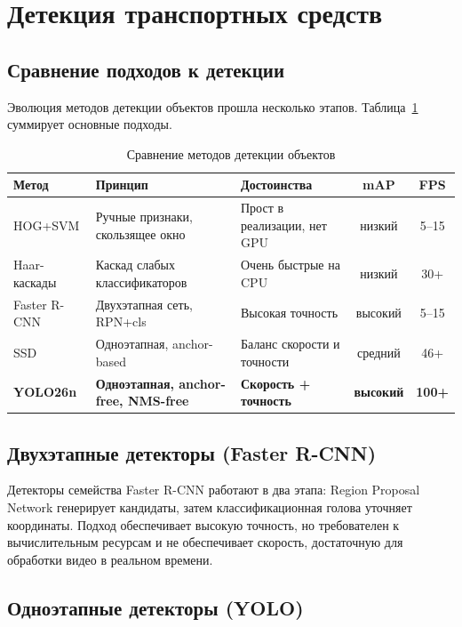 \documentclass[10pt,a4paper]{report}
\numberwithin{equation}{chapter}
\numberwithin{figure}{chapter}
\numberwithin{table}{chapter}
\begin{document}
\section{Детекция транспортных средств}

\subsection{Сравнение подходов к детекции}

Эволюция методов детекции объектов прошла несколько этапов.
Таблица~\ref{tab:detectors} суммирует основные подходы.

\begin{table}[H]
\centering
\caption{Сравнение методов детекции объектов}
\label{tab:detectors}
\begin{tabularx}{\textwidth}{l>{\raggedright\arraybackslash}X>{\raggedright\arraybackslash}Xcc}
\toprule
\textbf{Метод} & \textbf{Принцип} & \textbf{Достоинства} & \textbf{mAP} & \textbf{FPS} \\
\midrule
HOG+SVM       & Ручные признаки, скользящее окно   & Прост в реализации, нет GPU  & низкий & 5--15 \\
Haar-каскады  & Каскад слабых классификаторов      & Очень быстрые на CPU          & низкий & 30+ \\
Faster R-CNN  & Двухэтапная сеть, RPN+cls          & Высокая точность              & высокий & 5--15 \\
SSD           & Одноэтапная, anchor-based          & Баланс скорости и точности    & средний & 46+ \\
\textbf{YOLO26n} & \textbf{Одноэтапная, anchor-free, NMS-free} & \textbf{Скорость + точность} & \textbf{высокий} & \textbf{100+} \\
\bottomrule
\end{tabularx}
\end{table}

\subsection{Двухэтапные детекторы (Faster R-CNN)}

Детекторы семейства Faster R-CNN работают в два этапа: Region Proposal Network
генерирует кандидаты, затем классификационная голова уточняет координаты.
Подход обеспечивает высокую точность, но требователен к вычислительным ресурсам
и не обеспечивает скорость, достаточную для обработки видео в реальном времени.

\subsection{Одноэтапные детекторы (YOLO)}
\end{document}
